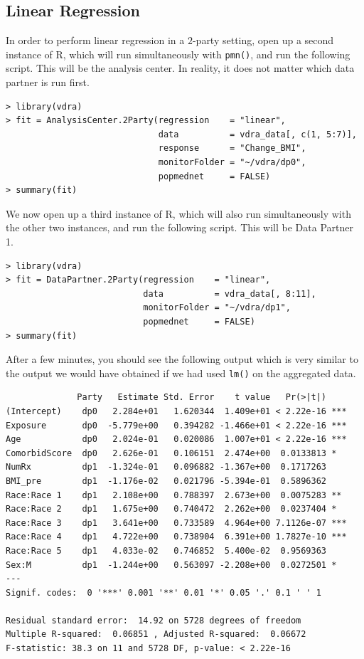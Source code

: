 \documentclass[12]{article}
\begin{document}
\subsection{Linear Regression}

In order to perform linear regression in a $2$-party setting, open up a second instance of R, which will run simultaneously with \verb"pmn()", and run the following script.  This will be the analysis center.  In reality, it does not matter which data partner is run first.

\begin{verbatim}
> library(vdra)
> fit = AnalysisCenter.2Party(regression    = "linear",
                              data          = vdra_data[, c(1, 5:7)],
                              response      = "Change_BMI",
                              monitorFolder = "~/vdra/dp0",
                              popmednet     = FALSE)
> summary(fit)
\end{verbatim}

We now open up a third instance of R, which will also run simultaneously with the other two instances, and run the following script.  This will be Data Partner 1.

\begin{verbatim}
> library(vdra)
> fit = DataPartner.2Party(regression    = "linear",
                           data          = vdra_data[, 8:11],
                           monitorFolder = "~/vdra/dp1",
                           popmednet     = FALSE)
> summary(fit)
\end{verbatim}

After a few minutes, you should see the following output which is very similar to the output we would have obtained if we had used \verb"lm()" on the aggregated data.

\begin{verbatim}
              Party   Estimate Std. Error    t value   Pr(>|t|)    
(Intercept)    dp0   2.284e+01   1.620344  1.409e+01 < 2.22e-16 ***
Exposure       dp0  -5.779e+00   0.394282 -1.466e+01 < 2.22e-16 ***
Age            dp0   2.024e-01   0.020086  1.007e+01 < 2.22e-16 ***
ComorbidScore  dp0   2.626e-01   0.106151  2.474e+00  0.0133813 *  
NumRx          dp1  -1.324e-01   0.096882 -1.367e+00  0.1717263    
BMI_pre        dp1  -1.176e-02   0.021796 -5.394e-01  0.5896362    
Race:Race 1    dp1   2.108e+00   0.788397  2.673e+00  0.0075283 ** 
Race:Race 2    dp1   1.675e+00   0.740472  2.262e+00  0.0237404 *  
Race:Race 3    dp1   3.641e+00   0.733589  4.964e+00 7.1126e-07 ***
Race:Race 4    dp1   4.722e+00   0.738904  6.391e+00 1.7827e-10 ***
Race:Race 5    dp1   4.033e-02   0.746852  5.400e-02  0.9569363    
Sex:M          dp1  -1.244e+00   0.563097 -2.208e+00  0.0272501 *  
--- 
Signif. codes:  0 '***' 0.001 '**' 0.01 '*' 0.05 '.' 0.1 ' ' 1

Residual standard error:  14.92 on 5728 degrees of freedom
Multiple R-squared:  0.06851 , Adjusted R-squared:  0.06672 
F-statistic: 38.3 on 11 and 5728 DF, p-value: < 2.22e-16 
\end{verbatim}
\end{document}
